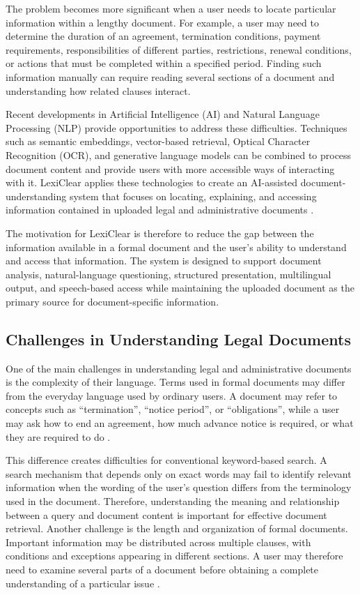\documentclass[12pt,a4paper,oneside]{report}
\begin{document}
The problem becomes more significant when a user needs to locate particular
information within a lengthy document. For example, a user may need to
determine the duration of an agreement, termination conditions, payment
requirements, responsibilities of different parties, restrictions, renewal
conditions, or actions that must be completed within a specified period.
Finding such information manually can require reading several sections of a
document and understanding how related clauses interact.

Recent developments in Artificial Intelligence (AI) and Natural Language
Processing (NLP) provide opportunities to address these difficulties.
Techniques such as semantic embeddings, vector-based retrieval, Optical
Character Recognition (OCR), and generative language models can be combined
to process document content and provide users with more accessible ways of
interacting with it. LexiClear applies these technologies to create an
AI-assisted document-understanding system that focuses on locating,
explaining, and accessing information contained in uploaded legal and
administrative documents \cite{reimers2019sbert,lewis2020rag}.

The motivation for LexiClear is therefore to reduce the gap between the
information available in a formal document and the user's ability to
understand and access that information. The system is designed to support
document analysis, natural-language questioning, structured presentation,
multilingual output, and speech-based access while maintaining the uploaded
document as the primary source for document-specific information.

\subsection{Challenges in Understanding Legal Documents}

One of the main challenges in understanding legal and administrative
documents is the complexity of their language. Terms used in formal
documents may differ from the everyday language used by ordinary users. A
document may refer to concepts such as ``termination'', ``notice period'', or
``obligations'', while a user may ask how to end an agreement, how much
advance notice is required, or what they are required to do \cite{charrow1979}.

This difference creates difficulties for conventional keyword-based search.
A search mechanism that depends only on exact words may fail to identify
relevant information when the wording of the user's question differs from
the terminology used in the document. Therefore, understanding the meaning
and relationship between a query and document content is important for
effective document retrieval. Another challenge is the length and organization of formal documents.
Important information may be distributed across multiple clauses, with
conditions and exceptions appearing in different sections. A user may
therefore need to examine several parts of a document before obtaining a
complete understanding of a particular issue \cite{reimers2019sbert}.
\end{document}
